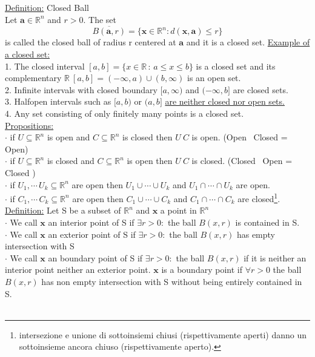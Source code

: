 \documentclass[a4paper,11pt]{article}
\begin{document}
\underline{Definition:} Closed Ball \\
Let $\mathbf{a } \in \mathbb{R}^n $ and $r > 0$. The set 
$$\overline{B(\mathbf{a},r)} = \{ \mathbf{x} \in \mathbb{R}^n : d(\mathbf{x,a}) \leq r\} $$
is called the closed ball of radius r centered at $\mathbf{a} $ and it is a closed set.
\underline{Example of a closed set:} \\
1. The closed interval $[a,b] = \{x \in \mathbb{R} \, : \, a \leq x \leq b\}$ is a closed set and its complementary $\mathbb{R} \ [a,b] = (-\infty,a) \cup (b,\infty) $ is an open set. \\
2. Infinite intervals with closed boundary $[a,\infty)$ and $(-\infty,b] $ are closed sets. \\
3. Halfopen intervals such as $[a,b)$ or $(a,b]$ \underline{are neither closed nor open sets.} \\
4. Any set consisting of only finitely many points is a closed set. \\
\underline{Propositions:} \\
$\cdot$ if $U \subseteq \mathbb{R}^n$ is open and $C \subseteq \mathbb{R}^n$ is closed then $U \ C$ is open.  (Open \ Closed = Open)   \\
$\cdot$ if $U \subseteq \mathbb{R}^n$ is closed and $C \subseteq \mathbb{R}^n$ is open then $U \ C$ is closed.  (Closed \ Open = Closed )  \\
$\cdot$ if $U_1 , \cdots \, U_k \subseteq \mathbb{R}^n $ are open then $U_1 \cup \cdots \cup U_k$ and $U_1 \cap \cdots \cap U_k$ are open. \\
$\cdot$ if $C_1 , \cdots \, C_k \subseteq \mathbb{R}^n $ are open then $C_1 \cup \cdots \cup C_k$ and $C_1 \cap \cdots \cap C_k$ are closed\footnote{intersezione e unione di sottoinsiemi chiusi (rispettivamente aperti) danno un sottoinsieme ancora chiuso (rispettivamente aperto).}. \\ 
\underline{Definition:} Let S be a subset of $\mathbb{R}^n$ and $\mathbf{x}$ a point in $\mathbb{R}^n$ \\
$\cdot$ We call $\mathbf{x}$ an interior point of S if $ \exists r > 0 : $ the ball $B(x,r)$ is contained in S. \\
$\cdot$ We call $\mathbf{x}$ an exterior point of S if  $ \exists r > 0 : $ the ball $B(x,r)$ has empty intersection with S \\
$\cdot$ We call $\mathbf{x}$ an boundary point of S if  $ \exists r > 0 : $ the ball $B(x,r)$ if it is neither an interior point neither an exterior point. $\mathbf{x}$ is a boundary point if $\forall r > 0$ the ball $B(x,r) $ has non empty intersection with S without being entirely contained in S. \\  \\
\end{document}
